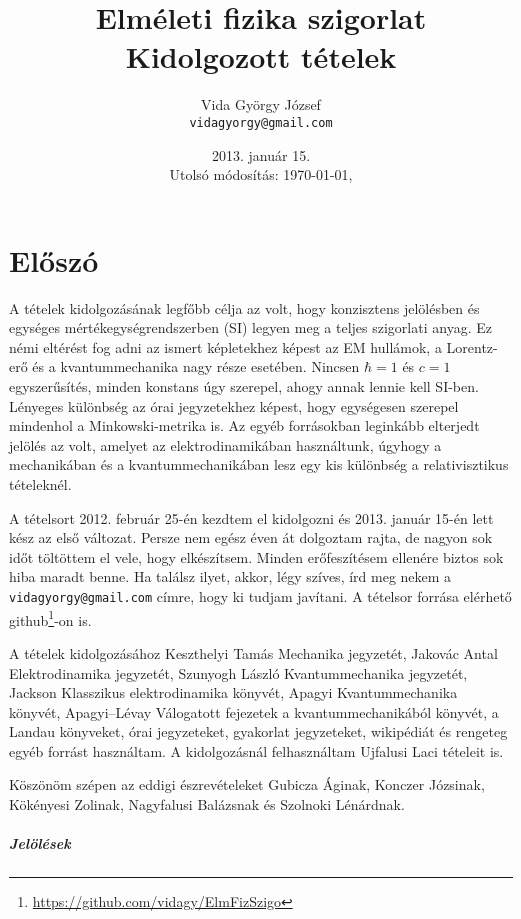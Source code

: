 \documentclass[a4paper,11pt,oneside,titlepage]{book}
\author{Vida Gy\"orgy J\'ozsef\\ \texttt{vidagyorgy@gmail.com}}
\title{Elm\'eleti fizika szigorlat \\ Kidolgozott t\'etelek}
\date{2013. január 15. \\ Utolsó módosítás: \today, \currenttime}
\begin{document}
 \maketitle
%  
 \chapter*{El\H{o}sz\'o}
  
  A tételek kidolgozásának legfőbb célja az volt, hogy konzisztens jelölésben és egységes mértékegységrendszerben (SI) legyen meg a teljes szigorlati anyag.
  Ez némi eltérést fog adni az ismert képletekhez képest az EM hullámok, a Lorentz-erő és a kvantummechanika nagy része esetében.
  Nincsen $\hbar=1$ és $c=1$ egyszerűsítés, minden konstans úgy szerepel, ahogy annak lennie kell SI-ben.
  Lényeges különbség az órai jegyzetekhez képest, hogy egységesen szerepel mindenhol a Minkowski-metrika is.
  Az egyéb forrásokban leginkább elterjedt jelölés az volt, amelyet az elektrodinamikában használtunk, úgyhogy a mechanikában és a kvantummechanikában lesz egy kis különbség a relativisztikus tételeknél.
  
  A tételsort 2012. február 25-én kezdtem el kidolgozni és 2013. január 15-én lett kész az első változat.
  Persze nem egész éven át dolgoztam rajta, de nagyon sok időt töltöttem el vele, hogy elkészítsem.
  Minden erőfeszítésem ellenére biztos sok hiba maradt benne.
  Ha találsz ilyet, akkor, légy szíves, írd meg nekem a \texttt{vidagyorgy@gmail.com} címre, hogy ki tudjam javítani. A tételsor forrása elérhető github\footnote{\url{https://github.com/vidagy/ElmFizSzigo}}-on is.
  
  A tételek kidolgozásához Keszthelyi Tamás Mechanika jegyzetét, Jakovác Antal Elektrodinamika jegyzetét, Szunyogh László Kvantummechanika jegyzetét, Jackson Klasszikus elektrodinamika könyvét, Apagyi Kvantummechanika könyvét, Apagyi--Lévay Válogatott fejezetek a kvantummechanikából könyvét, a Landau könyveket, órai jegyzeteket, gyakorlat jegyzeteket, wikipédiát és rengeteg egyéb forrást használtam.
  A kidolgozásnál felhasználtam Ujfalusi Laci tételeit is.
  
  Köszönöm szépen az eddigi észrevételeket Gubicza Áginak, Konczer Józsinak, Kökényesi Zolinak, Nagyfalusi Balázsnak és Szolnoki Lénárdnak.
  
  \paragraph{Jelölések}
  
\end{document}
